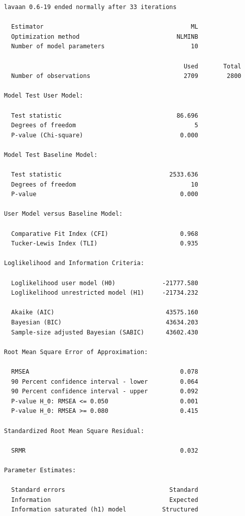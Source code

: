 \documentclass[
  letterpaper,
  DIV=11,
  numbers=noendperiod]{scrreprt}
\begin{document}
\begin{verbatim}
lavaan 0.6-19 ended normally after 33 iterations

  Estimator                                         ML
  Optimization method                           NLMINB
  Number of model parameters                        10

                                                  Used       Total
  Number of observations                          2709        2800

Model Test User Model:
                                                      
  Test statistic                                86.696
  Degrees of freedom                                 5
  P-value (Chi-square)                           0.000

Model Test Baseline Model:

  Test statistic                              2533.636
  Degrees of freedom                                10
  P-value                                        0.000

User Model versus Baseline Model:

  Comparative Fit Index (CFI)                    0.968
  Tucker-Lewis Index (TLI)                       0.935

Loglikelihood and Information Criteria:

  Loglikelihood user model (H0)             -21777.580
  Loglikelihood unrestricted model (H1)     -21734.232
                                                      
  Akaike (AIC)                               43575.160
  Bayesian (BIC)                             43634.203
  Sample-size adjusted Bayesian (SABIC)      43602.430

Root Mean Square Error of Approximation:

  RMSEA                                          0.078
  90 Percent confidence interval - lower         0.064
  90 Percent confidence interval - upper         0.092
  P-value H_0: RMSEA <= 0.050                    0.001
  P-value H_0: RMSEA >= 0.080                    0.415

Standardized Root Mean Square Residual:

  SRMR                                           0.032

Parameter Estimates:

  Standard errors                             Standard
  Information                                 Expected
  Information saturated (h1) model          Structured


\end{verbatim}
\end{document}
